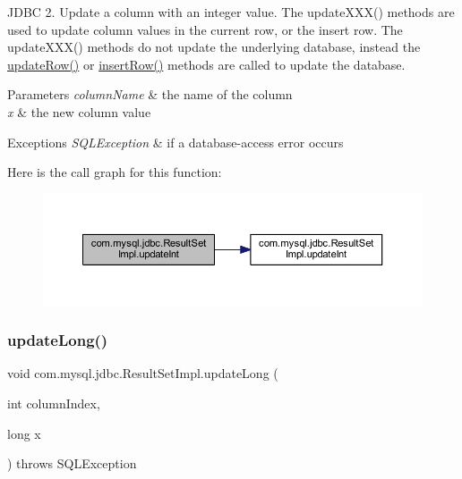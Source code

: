 J\+D\+BC 2. Update a column with an integer value. The update\+X\+X\+X() methods are used to update column values in the current row, or the insert row. The update\+X\+X\+X() methods do not update the underlying database, instead the \mbox{\hyperlink{classcom_1_1mysql_1_1jdbc_1_1_result_set_impl_a2842d32292d023aaeeafedeed3322981}{update\+Row()}} or \mbox{\hyperlink{classcom_1_1mysql_1_1jdbc_1_1_result_set_impl_a78e304e3279cbcf60392f18c1385e3bf}{insert\+Row()}} methods are called to update the database.


\begin{DoxyParams}{Parameters}
{\em column\+Name} & the name of the column \\
\hline
{\em x} & the new column value\\
\hline
\end{DoxyParams}

\begin{DoxyExceptions}{Exceptions}
{\em S\+Q\+L\+Exception} & if a database-\/access error occurs \\
\hline
\end{DoxyExceptions}
Here is the call graph for this function\+:
\nopagebreak
\begin{figure}[H]
\begin{center}
\leavevmode
\includegraphics[width=350pt]{classcom_1_1mysql_1_1jdbc_1_1_result_set_impl_a511245808d1194c70a39d7066ffd0761_cgraph}
\end{center}
\end{figure}
\mbox{\label{classcom_1_1mysql_1_1jdbc_1_1_result_set_impl_a58134de00af85af2be71ff502a060766}} 
\subsubsection{\texorpdfstring{update\+Long()}{updateLong()}\hspace{0.1cm}{\footnotesize\ttfamily [1/2]}}
{\footnotesize\ttfamily void com.\+mysql.\+jdbc.\+Result\+Set\+Impl.\+update\+Long (\begin{DoxyParamCaption}\item[{int}]{column\+Index,  }\item[{long}]{x }\end{DoxyParamCaption}) throws S\+Q\+L\+Exception}

